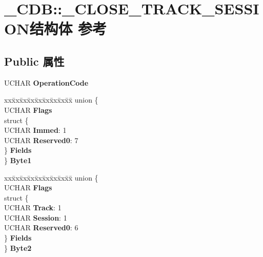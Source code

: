 \hypertarget{struct___c_d_b_1_1___c_l_o_s_e___t_r_a_c_k___s_e_s_s_i_o_n}{}\section{\+\_\+\+C\+DB\+:\+:\+\_\+\+C\+L\+O\+S\+E\+\_\+\+T\+R\+A\+C\+K\+\_\+\+S\+E\+S\+S\+I\+O\+N结构体 参考}
\label{struct___c_d_b_1_1___c_l_o_s_e___t_r_a_c_k___s_e_s_s_i_o_n}
\subsection*{Public 属性}
\begin{DoxyCompactItemize}
\item 
\mbox{\label{struct___c_d_b_1_1___c_l_o_s_e___t_r_a_c_k___s_e_s_s_i_o_n_a8048956e3b088139ea93abdc837a6f7f}} 
U\+C\+H\+AR {\bfseries Operation\+Code}
\item 
\mbox{\label{struct___c_d_b_1_1___c_l_o_s_e___t_r_a_c_k___s_e_s_s_i_o_n_a511e140bacdb49095ecb59c63eb02dd3}} 
\begin{tabbing}
xx\=xx\=xx\=xx\=xx\=xx\=xx\=xx\=xx\=\kill
union \{\\
\>UCHAR {\bfseries Flags}\\
\>struct \{\\
\>\>UCHAR {\bfseries Immed}: 1\\
\>\>UCHAR {\bfseries Reserved0}: 7\\
\>\} {\bfseries Fields}\\
\} {\bfseries Byte1}\\

\end{tabbing}\item 
\mbox{\label{struct___c_d_b_1_1___c_l_o_s_e___t_r_a_c_k___s_e_s_s_i_o_n_ae78b7e6b7d3b774799787bdc693c351f}} 
\begin{tabbing}
xx\=xx\=xx\=xx\=xx\=xx\=xx\=xx\=xx\=\kill
union \{\\
\>UCHAR {\bfseries Flags}\\
\>struct \{\\
\>\>UCHAR {\bfseries Track}: 1\\
\>\>UCHAR {\bfseries Session}: 1\\
\>\>UCHAR {\bfseries Reserved0}: 6\\
\>\} {\bfseries Fields}\\
\} {\bfseries Byte2}\\


\end{tabbing}
\end{DoxyCompactItemize}
